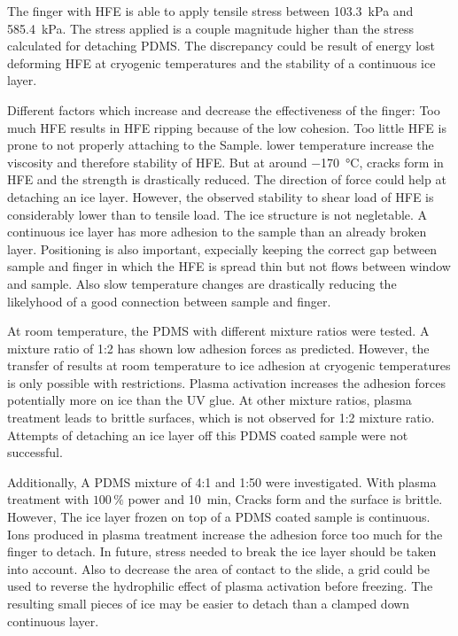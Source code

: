 The finger with HFE is able to apply tensile stress between \SI{103.3}{\kilo\pascal} and \SI{585.4}{\kilo\pascal}. The stress applied is a couple magnitude higher than the stress calculated for detaching PDMS. The discrepancy could be result of energy lost deforming HFE at cryogenic temperatures and the stability of a continuous ice layer.

Different factors which increase and decrease the effectiveness of the finger: Too much HFE results in HFE ripping because of the low cohesion. Too little HFE is prone to not properly attaching to the Sample. lower temperature increase the viscosity and therefore stability of HFE. But at around \SI{-170}{\degreeCelsius}, cracks form in HFE and the strength is drastically reduced. The direction of force could help at detaching an ice layer. However, the observed stability to shear load of HFE is considerably lower than to tensile load. The ice structure is not negletable. A continuous ice layer has more adhesion to the sample than an already broken layer. Positioning is also important, expecially keeping the correct gap between sample and finger in which the HFE is spread thin but not flows between window and sample. Also slow temperature changes are drastically reducing the likelyhood of a good connection between sample and finger.

At room temperature, the PDMS with different mixture ratios were tested. A mixture ratio of 1:2 has shown low adhesion forces as predicted. However, the transfer of results at room temperature to ice adhesion at cryogenic temperatures is only possible with restrictions. Plasma activation increases the adhesion forces potentially more on ice than the UV glue. At other mixture ratios, plasma treatment leads to brittle surfaces, which is not observed for 1:2 mixture ratio. Attempts of detaching an ice layer off this PDMS coated sample were not successful.

Additionally, A PDMS mixture of 4:1 and 1:50 were investigated. With plasma treatment with $100\,\%$ power and \SI{10}{\minute}, Cracks form and the surface is brittle. However, The ice layer frozen on top of a PDMS coated sample is continuous. Ions produced in plasma treatment increase the adhesion force too much for the finger to detach. In future, stress needed to break the ice layer should be taken into account. Also to decrease the area of contact to the slide, a grid could be used to reverse the hydrophilic effect of plasma activation before freezing. The resulting small pieces of ice may be easier to detach than a clamped down continuous layer.


